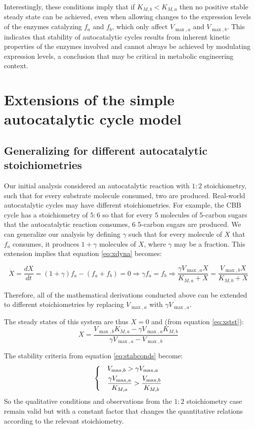 \documentclass[a4page,notitlepage]{article}
\begin{document}
    Interestingly, these conditions imply that if $K_{M,b}<K_{M,a}$ then no positive stable steady state can be achieved, even when allowing changes to the expression levels of the enzymes catalyzing $f_a$ and $f_b$, which only affect $V_{\max,a}$ and $V_{\max,b}$.
    This indicates that stability of autocatalytic cycles results from inherent kinetic properties of the enzymes involved and cannot always be achieved by modulating expression levels, a conclusion that may be critical in metabolic engineering context.
\section{Extensions of the simple autocatalytic cycle model}
    \subsection{Generalizing for different autocatalytic stoichiometries}
    Our initial analysis considered an autocatalytic reaction with $1:2$ stoichiometry, such that for every substrate molecule consumed, two are produced.
    Real-world autocatalytic cycles may have different stoichiometries.
    For example, the CBB cycle has a stoichiometry of $5:6$ so that for every 5 molecules of 5-carbon sugars that the autocatalytic reaction consumes, 6 5-carbon sugars are produced.
    We can generalize our analysis by defining $\gamma$ such that for every molecule of $X$ that $f_a$ consumes, it produces $1+\gamma$ molecules of $X$, where $\gamma$ may be a fraction.
    This extension implies that equation \eqref{eq:xdyna} becomes:

    \begin{equation*}
      \dot X = \frac{dX}{dt} = (1+\gamma)f_a - (f_a + f_b) = 0 \Rightarrow \gamma f_a = f_b \Rightarrow \frac{\gamma V_{\max,a}X}{K_{M,a}+X}=\frac{V_{\max,b}X}{K_{M,b}+X}
    \end{equation*}

    Therefore, all of the mathematical derivations conducted above can be extended to different stoichiometries by replacing $V_{\max,a}$ with $\gamma V_{\max,a}$.

    The steady states of this system are thus $X=0$ and (from equation \eqref{eq:xstst}):
    \begin{equation*}
      X=\frac{V_{\max,b}K_{M,a}-\gamma V_{\max,a}K_{M,b}}{\gamma V_{\max,a}-V_{\max,b}}
    \end{equation*}

    The stability criteria from equation \eqref{eq:stabconds} become:
    \begin{equation*}
    \begin{dcases}
      & V_{\max,b}>\gamma V_{\max,a} \\
      & \frac{\gamma V_{\max,a}}{K_{M,a}}>\frac{V_{\max,b}}{K_{M,b}}
    \end{dcases}
    \end{equation*}
    So the qualitative conditions and observations from the $1:2$ stoichiometry case remain valid but with a constant factor that changes the quantitative relations according to the relevant stoichiometry.
\end{document}
